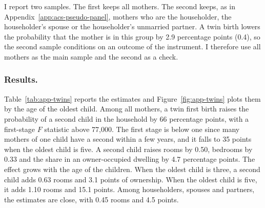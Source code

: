 I report two samples. The first keeps all mothers. The second keeps, as in
Appendix~\ref{app:acs-pseudo-panel}, mothers who are the householder, the
householder's spouse or the householder's unmarried partner. A twin birth
lowers the probability that the mother is in this group by 2.9 percentage
points (0.4), so the second sample conditions on an outcome of the
instrument. I therefore use all mothers as the main sample and the second as
a check.

\subsubsection*{Results.}
Table~\ref{tab:app-twins} reports the estimates and
Figure~\ref{fig:app-twins} plots them by the age of the oldest child. Among
all mothers, a twin first birth raises the probability of a second child in
the household by 66 percentage points, with a first-stage $F$ statistic
above 77,000. The first stage is below one since many mothers of one child
have a second within a few years, and it falls to 35 points when the oldest
child is five. A second child raises rooms by 0.50, bedrooms by 0.33 and the
share in an owner-occupied dwelling by 4.7 percentage points. The effect
grows with the age of the children. When the oldest child is three, a second
child adds 0.63 rooms and 3.1 points of ownership. When the oldest child is
five, it adds 1.10 rooms and 15.1 points. Among householders, spouses and
partners, the estimates are close, with 0.45 rooms and 4.5 points.

